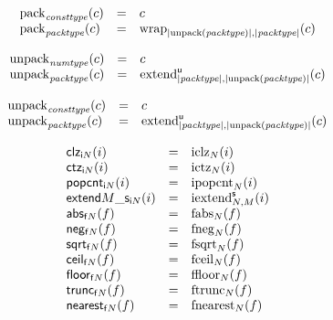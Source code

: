 $$
\begin{array}[t]{@{}lcl@{}l@{}}
{{\mathrm{pack}}}_{{\mathit{consttype}}}(c) & = & c \\
{{\mathrm{pack}}}_{{\mathit{packtype}}}(c) & = & {{\mathrm{wrap}}}_{{|{\mathrm{unpack}}({\mathit{packtype}})|}, {|{\mathit{packtype}}|}}(c) \\
\end{array}
$$

\vspace{1ex}

$$
\begin{array}[t]{@{}lcl@{}l@{}}
{{\mathrm{unpack}}}_{{\mathit{numtype}}}(c) & = & c \\
{{\mathrm{unpack}}}_{{\mathit{packtype}}}(c) & = & {{{{\mathrm{extend}}}_{{|{\mathit{packtype}}|}, {|{\mathrm{unpack}}({\mathit{packtype}})|}}^{\mathsf{u}}}}{(c)} \\
\end{array}
$$

$$
\begin{array}[t]{@{}lcl@{}l@{}}
{{\mathrm{unpack}}}_{{\mathit{consttype}}}(c) & = & c \\
{{\mathrm{unpack}}}_{{\mathit{packtype}}}(c) & = & {{{{\mathrm{extend}}}_{{|{\mathit{packtype}}|}, {|{\mathrm{unpack}}({\mathit{packtype}})|}}^{\mathsf{u}}}}{(c)} \\
\end{array}
$$

\vspace{1ex}

$$
\begin{array}[t]{@{}lcl@{}l@{}}
{\mathsf{clz}}{{}_{{\mathsf{i}}{N}}(i)} & = & {{\mathrm{iclz}}}_{N}(i) \\
{\mathsf{ctz}}{{}_{{\mathsf{i}}{N}}(i)} & = & {{\mathrm{ictz}}}_{N}(i) \\
{\mathsf{popcnt}}{{}_{{\mathsf{i}}{N}}(i)} & = & {{\mathrm{ipopcnt}}}_{N}(i) \\
{{\mathsf{extend}}{M}{\mathsf{\_}}{\mathsf{s}}}{{}_{{\mathsf{i}}{N}}(i)} & = & {{{{\mathrm{iextend}}}_{N, M}^{\mathsf{s}}}}{(i)} \\
{\mathsf{abs}}{{}_{{\mathsf{f}}{N}}(f)} & = & {{\mathrm{fabs}}}_{N}(f) \\
{\mathsf{neg}}{{}_{{\mathsf{f}}{N}}(f)} & = & {{\mathrm{fneg}}}_{N}(f) \\
{\mathsf{sqrt}}{{}_{{\mathsf{f}}{N}}(f)} & = & {{\mathrm{fsqrt}}}_{N}(f) \\
{\mathsf{ceil}}{{}_{{\mathsf{f}}{N}}(f)} & = & {{\mathrm{fceil}}}_{N}(f) \\
{\mathsf{floor}}{{}_{{\mathsf{f}}{N}}(f)} & = & {{\mathrm{ffloor}}}_{N}(f) \\
{\mathsf{trunc}}{{}_{{\mathsf{f}}{N}}(f)} & = & {{\mathrm{ftrunc}}}_{N}(f) \\
{\mathsf{nearest}}{{}_{{\mathsf{f}}{N}}(f)} & = & {{\mathrm{fnearest}}}_{N}(f) \\
\end{array}
$$

